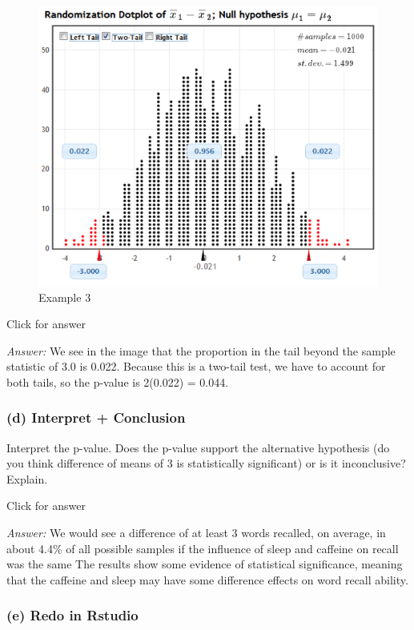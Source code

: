 \documentclass[
]{book}
\begin{document}
\begin{figure}
\centering
\includegraphics{data/wordRand.png}
\caption{Example 3}
\end{figure}

Click for answer

\emph{Answer:} We see in the image that the proportion in the tail beyond the sample statistic of 3.0 is 0.022. Because this is a two-tail test, we have to account for both tails, so the p-value is 2(0.022) = 0.044.

\hypertarget{d-interpret-conclusion-1}{%
\subsubsection{(d) Interpret + Conclusion}\label{d-interpret-conclusion-1}}

Interpret the p-value. Does the p-value support the alternative hypothesis (do you think difference of means of 3 is statistically significant) or is it inconclusive? Explain.

Click for answer

\emph{Answer:} We would see a difference of at least 3 words recalled, on average, in about 4.4\% of all possible samples if the influence of sleep and caffeine on recall was the same The results show some evidence of statistical significance, meaning that the caffeine and sleep may have some difference effects on word recall ability.

\hypertarget{e-redo-in-rstudio}{%
\subsubsection{(e) Redo in Rstudio}\label{e-redo-in-rstudio}}
\end{document}
